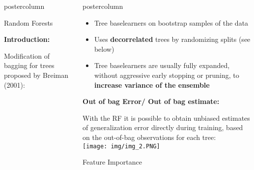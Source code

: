 \documentclass{beamer}
\newlength{\columnheight} %
\begin{document}
\begin{frame}[fragile]{}
\begin{columns}
\begin{column}{.31\textwidth}
\begin{beamercolorbox}[center]{postercolumn}
\begin{minipage}{.98\textwidth}
{\begin{myblock}{Random Forests}
				\begin{codebox} \textbf{Introduction: }
					\end{codebox}
					Modification of bagging for trees proposed by Breiman (2001):
					
					\hspace*{1ex}
					\end{myblock}\vfill
				}
			\end{minipage}
		\end{beamercolorbox}
	\end{column}
	\begin{column}{.31\textwidth}
		\begin{beamercolorbox}[center]{postercolumn}
			\begin{minipage}{.98\textwidth}
				\parbox[t][\columnheight]{\textwidth}{
				\begin{myblock}{ }
					\begin{itemize}
                        \item Tree baselearners on bootstrap samples of the data
                        \item Uses \textbf{decorrelated} trees by randomizing splits (see below)
                        \item Tree baselearners are usually fully expanded, without aggressive early stopping or pruning, to \textbf{increase variance of the ensemble}
                    \end{itemize}
                    \hspace*{1ex}
                
                \begin{codebox}
					\textbf{Out of bag Error/ Out of bag estimate:}
				\end{codebox}
				With the RF it is possible to obtain unbiased estimates of generalization error directly during training, based on the out-of-bag observations for each tree:\\
				
				\hspace*{1ex}
				\texttt{[image: img/img\_2.PNG]}
                \hspace*{1ex}
    
			    \end{myblock}
				
				\begin{myblock}{Feature Importance}
						

\end{myblock}}
\end{minipage}
\end{beamercolorbox}
\end{column}
\end{columns}
\end{frame}
\end{document}
